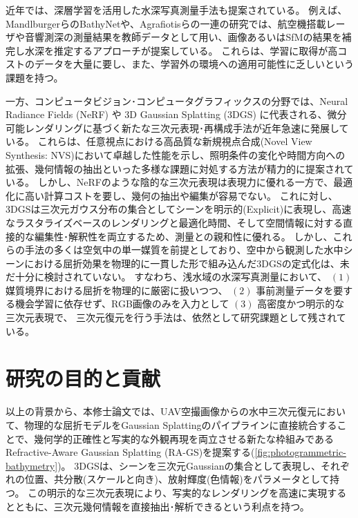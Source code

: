 近年では、深層学習を活用した水深写真測量手法も提案されている。
例えば、Mandlburgerら\cite{Mandlburger2021_BathyNet}のBathyNetや、Agrafiotisら\cite{Agrafiotis2019ISPRS_SVM-UAV-Bathymetry,Agrafiotis2020_refractiveCorrection}の一連の研究では、航空機搭載レーザや音響測深の測量結果を教師データとして用い、画像あるいはSfMの結果を補完し水深を推定するアプローチが提案している。
これらは、学習に取得が高コストのデータを大量に要し、また、学習外の環境への適用可能性に乏しいという課題を持つ。

一方、コンピュータビジョン･コンピュータグラフィックスの分野では、Neural Radiance Fields (NeRF) \cite{Mildenhall2021ECCV_NeRF} や 3D Gaussian Splatting (3DGS) \cite{Kerbl2023ToG_3DGS} に代表される、微分可能レンダリングに基づく新たな三次元表現･再構成手法が近年急速に発展している。
これらは、任意視点における高品質な新規視点合成(Novel View Synthesis: NVS)において卓越した性能を示し、照明条件の変化や時間方向への拡張、幾何情報の抽出といった多様な課題に対処する方法が精力的に提案されている\cite{Gu2024CVPR_SuGaR,Jiang2024CVPR_GaussianShader}。
しかし、NeRFのような陰的な三次元表現は表現力に優れる一方で、最適化に高い計算コストを要し、幾何の抽出や編集が容易でない。
これに対し、3DGSは三次元ガウス分布の集合としてシーンを明示的(Explicit)に表現し、高速なラスタライズベースのレンダリングと最適化時間、そして空間情報に対する直接的な編集性･解釈性を両立するため、測量との親和性に優れる。
しかし、これらの手法の多くは空気中の単一媒質を前提としており、空中から観測した水中シーンにおける屈折効果を物理的に一貫した形で組み込んだ3DGSの定式化は、未だ十分に検討されていない。
すなわち、浅水域の水深写真測量において、
$(1)$ 媒質境界における屈折を物理的に厳密に扱いつつ、
$(2)$ 事前測量データを要する機会学習に依存せず、RGB画像のみを入力として
$(3)$ 高密度かつ明示的な三次元表現で、
三次元復元を行う手法は、依然として研究課題として残されている。

\section{研究の目的と貢献}\label{sec:intro-purpose-contribution}

以上の背景から、本修士論文では、UAV空撮画像からの水中三次元復元において、物理的な屈折モデルをGaussian Splattingのパイプラインに直接統合することで、幾何学的正確性と写実的な外観再現を両立させる新たな枠組みであるRefractive-Aware Gaussian Splatting (RA-GS)を提案する(\cref{fig:photogrammetric-bathymetry})。
3DGSは、シーンを三次元Gaussianの集合として表現し、それぞれの位置、共分散(スケールと向き)、放射輝度(色情報)をパラメータとして持つ。
この明示的な三次元表現により、写実的なレンダリングを高速に実現するとともに、三次元幾何情報を直接抽出･解析できるという利点を持つ。

